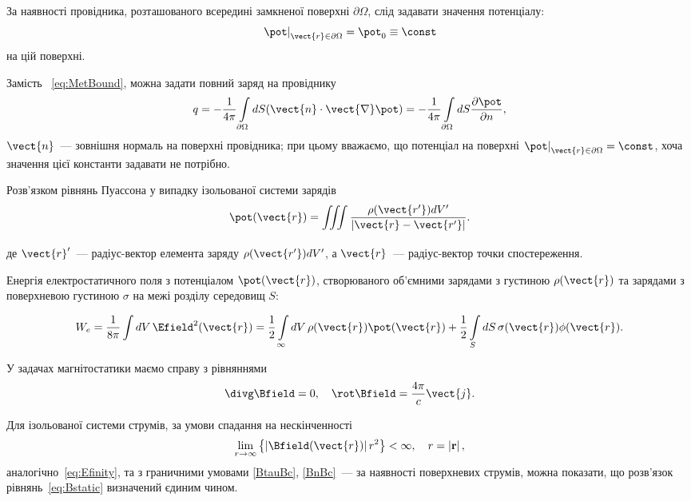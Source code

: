 \begin{Theory}
	За наявності провідника, розташованого всередині замкненої поверхні $\partial\Omega$,  слід задавати значення потенціалу:
	\begin{equation}\label{eq:MetBound}
		\left. \pot  \right|_{\vect{r} \in \partial \Omega}  = \pot_0 \equiv \const
	\end{equation}
	на цій поверхні.

	Замість~ \eqref{eq:MetBound}, можна задати повний заряд на провіднику
	\begin{equation}\label{}
		q = -\frac{1}{4\pi}\int\limits_{\partial\Omega} dS (\vect{n}\cdot\vect{\nabla}\pot) =  -\frac{1}{4\pi}\int\limits_{\partial\Omega} dS \frac{\partial \pot}{\partial n},
	\end{equation}
    $\vect{n}$~---	зовнішня нормаль на поверхні провідника; при цьому вважаємо, що потенціал на поверхні $\left. \pot  \right|_{\vect{r} \in \partial \Omega}  = \const$, хоча значення цієї константи задавати не потрібно.


	Розв'язком рівнянь Пуассона у випадку ізольованої системи зарядів
	\begin{equation}\label{Supperposition_principle}
		\pot(\vect{r}) = \iiint\limits_{} \frac{\rho(\vect{r'}) dV'}{\left| \vect{r} - \vect{r'} \right|}.
	\end{equation}
	де $\vect{r}'$~--- радіус-вектор елемента заряду $\rho(\vect{r'}) dV'$, а $\vect{r}$~--- радіус-вектор точки спостереження.

Енергія електростатичного поля з потенціалом $\pot(\vect{r})$, створюваного об’ємними зарядами з густиною $\rho(\vect{r})$  та зарядами з поверхневою густиною $\sigma$  на межі розділу середовищ $S$:


\begin{equation}\label{eq:We}
W_e = \frac{1}{8\pi}\int {dV} \, \Efield^2(\vect{r}) = \frac{1}{2}\int\limits_\infty  dV\, \rho (\vect{r}) \pot(\vect{r}) + \frac{1}{2}\int\limits_S dS\, \sigma(\vect{r}) \phi (\vect{r}).
\end{equation}


	У задачах магнітостатики маємо справу з рівняннями
	\begin{equation}\label{eq:Bstatic}
		\divg\Bfield = 0, \quad \rot\Bfield = \frac{4\pi}{c}\vect{j}.
	\end{equation}

	Для ізольованої системи струмів, за умови спадання на нескінченності
	\begin{equation}\label{}
		\lim\limits_{r \to \infty } \left\{ {\left| \Bfield(\vect{r}) \right|{r^2}} \right\} < \infty ,\quad r = \left| {\bf{r}} \right|,
	\end{equation}
	аналогічно~\eqref{eq:Efinity}, та з граничними умовами \eqref{BtauBc}, \eqref{BnBc}~--- за наявності поверхневих струмів, можна показати, що розв’язок рівнянь~\eqref{eq:Bstatic} визначений єдиним чином.


\end{Theory}

